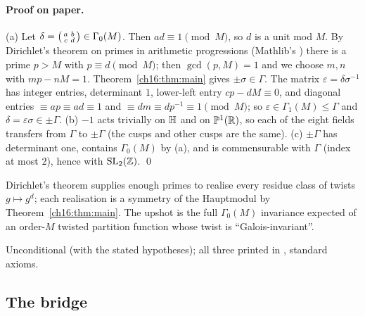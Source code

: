 \paragraph{Proof on paper.}  (a) Let $\delta=\left(\begin{smallmatrix}a&b\\c&d\end{smallmatrix}\right)\in\Gamma_0(M)$.  Then $ad\equiv1\pmod M$, so $d$ is a unit
mod $M$.  By Dirichlet's theorem on primes in arithmetic progressions (Mathlib's
) there is a prime $p>M$ with $p\equiv d\pmod M$; then $\gcd(p,M)=1$ and we
choose $m,n$ with $mp-nM=1$.  Theorem~\ref{ch16:thm:main} gives $\pm\sigma\in\Gamma$.  The matrix
$\varepsilon=\delta\sigma^{-1}$ has integer entries, determinant $1$, lower-left entry $cp-dM\equiv0$, and diagonal
entries $\equiv ap\equiv ad\equiv1$ and $\equiv dm\equiv dp^{-1}\equiv1\pmod M$; so $\varepsilon\in\Gamma_1(M)\le\Gamma$ and
$\delta=\varepsilon\sigma\in\pm\Gamma$.  (b) $-1$ acts trivially on $\mathbb{H}$ and on $\mathbb{P}^1(\mathbb{R})$, so each of
the eight fields transfers from $\Gamma$ to $\pm\Gamma$ (the cusps and other cusps are the same).  (c) $\pm\Gamma$ has
determinant one, contains $\Gamma_0(M)$ by (a), and is commensurable with $\Gamma$ (index at most $2$), hence with
$\mathrm{SL}_2(\mathbb{Z})$. \qed
\begin{physics}
Dirichlet's theorem supplies enough primes to realise every residue class of twists $g\mapsto g^d$; each realisation is
a symmetry of the Hauptmodul by Theorem~\ref{ch16:thm:main}.  The upshot is the full $\Gamma_0(M)$ invariance expected of
an order-$M$ twisted partition function whose twist is ``Galois-invariant''.
\end{physics}
\begin{status}
Unconditional (with the stated hypotheses); all three printed in ,
standard axioms.
\end{status}

\subsection{The bridge}

